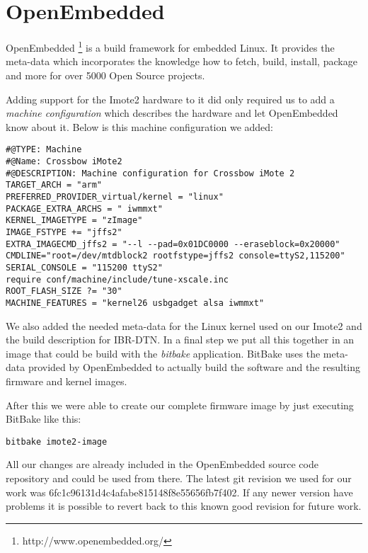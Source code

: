 \chapter{OpenEmbedded}
\label{annexoe}

OpenEmbedded \footnote{http://www.openembedded.org/} is a build framework for
embedded Linux. It provides the meta-data which incorporates the knowledge how
to fetch, build, install, package and more for over 5000 Open Source projects.

Adding support for the Imote2 hardware to it did only required us to add a
\emph{machine configuration} which describes the hardware and let OpenEmbedded
know about it. Below is this machine configuration we added:

\begin{verbatim}
#@TYPE: Machine
#@Name: Crossbow iMote2
#@DESCRIPTION: Machine configuration for Crossbow iMote 2
TARGET_ARCH = "arm"
PREFERRED_PROVIDER_virtual/kernel = "linux"
PACKAGE_EXTRA_ARCHS = " iwmmxt"
KERNEL_IMAGETYPE = "zImage"
IMAGE_FSTYPE += "jffs2"
EXTRA_IMAGECMD_jffs2 = "--l --pad=0x01DC0000 --eraseblock=0x20000"
CMDLINE="root=/dev/mtdblock2 rootfstype=jffs2 console=ttyS2,115200"
SERIAL_CONSOLE = "115200 ttyS2"
require conf/machine/include/tune-xscale.inc
ROOT_FLASH_SIZE ?= "30"
MACHINE_FEATURES = "kernel26 usbgadget alsa iwmmxt"
\end{verbatim}

We also added the needed meta-data for the Linux kernel used on our Imote2 and
the build description for IBR-DTN. In a final step we put all this together in
an image that could be build with the \emph{bitbake} application. BitBake uses
the meta-data provided by OpenEmbedded to actually build the software and the
resulting firmware and kernel images.

After this we were able to create our complete firmware image by just executing
BitBake like this:

\begin{verbatim}
bitbake imote2-image
\end{verbatim}

All our changes are already included in the OpenEmbedded source code repository
and could be used from there. The latest git revision we used for our work was
6fc1c96131d4c4afabe815148f8e55656fb7f402. If any newer version have problems it
is possible to revert back to this known good revision for future work.
